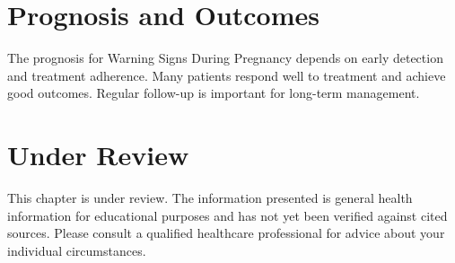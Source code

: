 \section*{Prognosis and Outcomes}
The prognosis for Warning Signs During Pregnancy depends on early detection and treatment adherence. Many patients respond well to treatment and achieve good outcomes. Regular follow-up is important for long-term management.
\section*{Under Review}
This chapter is under review. The information presented is general health information for educational purposes and has not yet been verified against cited sources. Please consult a qualified healthcare professional for advice about your individual circumstances.


\clearpage
